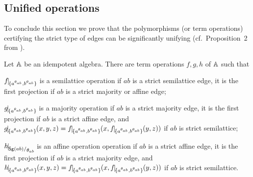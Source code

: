 \documentclass[11pt]{article}
\begin{document}
\subsection{Unified operations}\label{sec:unified}

To conclude this section we prove that the polymorphisms (or term operations) 
certifying the strict type of edges can be significantly unifying (cf.\ Proposition~2
from \cite{Bulatov03:conservative}).
\begin{theorem}\label{the:uniform}
Let ${\mathbb A}$ be an idempotent algebra. There are term operations $f,g,h$
of ${\mathbb A}$ such that 
\begin{description}
\item
$f\red{\{a^{\th_{ab}},b^{\th_{ab}}\}}$ is a semilattice
operation if $ab$ is a strict semilattice edge, it is the first projection if $ab$ is a 
strict majority or affine edge;
\item
$g\red{\{a^{\th_{ab}},b^{\th_{ab}}\}}$ is a majority
operation if $ab$ is a strict majority edge, it is the first
projection if $ab$ is a strict affine edge, and
$g\red{\{a^{\th_{ab}},b^{\th_{ab}}\}}(x,y,z)=
f\red{\{a^{\th_{ab}},b^{\th_{ab}}\}}(x,
f\red{\{a^{\th_{ab}},b^{\th_{ab}}\}}(y,z))$ if $ab$ is 
strict semilattice;
\item
$h\red{\Sg{ab}\fac{\th_{ab}}}$ is an affine operation
operation if $ab$ is a strict affine edge, it is the first
projection if $ab$ is a strict majority edge, and
$h\red{\{a^{\th_{ab}},b^{\th_{ab}}\}}(x,y,z)=
f\red{\{a^{\th_{ab}},b^{\th_{ab}}\}}(x,
f\red{\{a^{\th_{ab}},b^{\th_{ab}}\}}(y,z))$ if $ab$ is strict semilattice.
\end{description}
\end{theorem}
\end{document}
